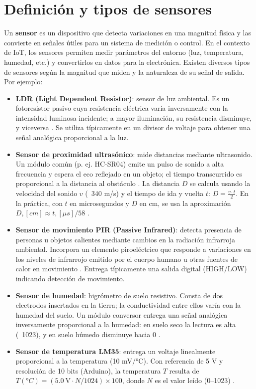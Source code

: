 \section{Definición y tipos de sensores}

Un \textbf{sensor} es un dispositivo que detecta variaciones en una magnitud física y las convierte en señales útiles para un sistema de medición o control. En el contexto de IoT, los sensores permiten medir parámetros del entorno (luz, temperatura, humedad, etc.) y convertirlos en datos para la electrónica. Existen diversos tipos de sensores según la magnitud que miden y la naturaleza de su señal de salida. Por ejemplo:
\begin{itemize}
    \item \textbf{LDR (Light Dependent Resistor)}: sensor de luz ambiental. Es un fotoresistor pasivo cuya resistencia eléctrica varía inversamente con la intensidad luminosa incidente; a mayor iluminación, su resistencia disminuye, y viceversa \cite{Sensores-2}. Se utiliza típicamente en un divisor de voltaje para obtener una señal analógica proporcional a la luz.

    \item \textbf{Sensor de proximidad ultrasónico}: mide distancias mediante ultrasonido. Un módulo común (p. ej. HC-SR04) emite un pulso de sonido a alta frecuencia y espera el eco reflejado en un objeto; el tiempo transcurrido es proporcional a la distancia al obstáculo \cite{naylamp2025ultrasonico}. La distancia \(D\) se calcula usando la velocidad del sonido \(v\) (~340 m/s) y el tiempo de ida y vuelta \(t\): \(D = \frac{v \cdot t}{2}\). En la práctica, con \(t\) en microsegundos y \(D\) en cm, se usa la aproximación \(D,[cm] \approx t,[\mu s]/58\) \cite{Marquez2016Ultrasonico}.

    \item \textbf{Sensor de movimiento PIR (Passive Infrared)}: detecta presencia de personas u objetos calientes mediante cambios en la radiación infrarroja ambiental. Incorpora un elemento piroeléctrico que responde a variaciones en los niveles de infrarrojo emitido por el cuerpo humano u otras fuentes de calor en movimiento \cite{Sensores-1}. Entrega típicamente una salida digital (HIGH/LOW) indicando detección de movimiento.

    \item \textbf{Sensor de humedad}: higrómetro de suelo resistivo. Consta de dos electrodos insertados en la tierra; la conductividad entre ellos varía con la humedad del suelo. Un módulo conversor entrega una señal analógica inversamente proporcional a la humedad: en suelo seco la lectura es alta (~1023), y en suelo húmedo disminuye hacia 0 \cite{AbrahamG2020Humedad}.

    \item \textbf{Sensor de temperatura LM35}: entrega un voltaje linealmente proporcional a la temperatura (10 mV/°C). Con referencia de 5 V y resolución de 10 bits (Arduino), la temperatura \(T\) resulta de \(T(°C) = (5.0~\text{V} \cdot N / 1024) \times 100\), donde \(N\) es el valor leído (0–1023) \cite{Actuadores-2}.
\end{itemize}
